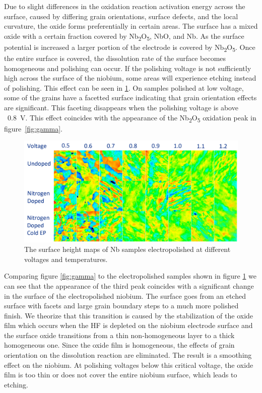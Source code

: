 Due to slight differences in the oxidation reaction activation energy across the surface, caused by differing grain orientations, surface defects, and the local curvature, the oxide forms preferentially in certain areas. The surface has a mixed oxide with a certain fraction covered by Nb\textsubscript{2}O\textsubscript{5}, NbO, and Nb. As the surface potential is increased a larger portion of the electrode is covered by Nb\textsubscript{2}O\textsubscript{5}. Once the entire surface is covered, the dissolution rate of the surface becomes homogeneous and polishing can occur. If the polishing voltage is not sufficiently high across the surface of the niobium, some areas will experience etching instead of polishing. This effect can be seen in \ref{fig:surface_maps}. On samples polished at low voltage, some of the grains have a facetted surface indicating that grain orientation effects are significant. This faceting disappears when the polishing voltage is above ~\qty{0.8}{\volt}. This effect coincides with the appearance of the Nb\textsubscript{2}O\textsubscript{5} oxidation peak in figure~\ref{fig:gamma}.

\begin{figure}
    
  \includegraphics[width=\textwidth]{./figures/surface_maps.png}
  \caption{The surface height maps of Nb samples electropolished at different voltages and temperatures.}
  \label{fig:surface_maps}
\end{figure}

Comparing figure \ref{fig:gamma} to the electropolished samples shown in figure \ref{fig:surface_maps} we can see that the appearance of the third peak coincides with a significant change in the surface of the electropolished niobium. The surface goes from an etched surface with facets and large grain boundary steps to a much more polished finish. We theorize that this transition is caused by the stabilization of the oxide film which occurs when the HF is depleted on the niobium electrode surface and the surface oxide transitions from a thin non-homogeneous layer to a thick homogeneous one. Since the oxide film is homogeneous, the effects of grain orientation on the dissolution reaction are eliminated. The result is a smoothing effect on the niobium. At polishing voltages below this critical voltage, the oxide film is too thin or does not cover the entire niobium surface, which leads to etching.

